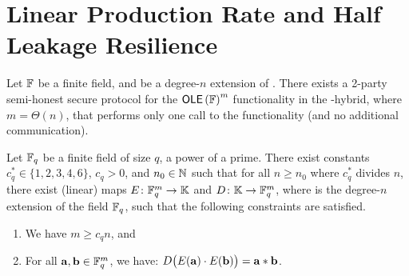 \section{Linear Production Rate and Half Leakage Resilience}

	\begin{theorem}
		\label{thm:embed-low}
		Let ${\mathbb F}$ be a finite field, and \bbK be a degree-$n$ extension of \bbF. 
		There exists a 2-party semi-honest secure protocol for the $\OLE[\bbF]^m$ functionality in the \OLE[\bbK]-hybrid, where $m=\Theta(n)$, that performs only one call to the \OLE[\bbK] functionality (and no additional communication). 
	\end{theorem}

	\begin{theorem}
		\label{thm:embed}
		Let ${\mathbb F}_q$ be a finite field of size $q$, a power of a prime. 
		There exist constants $c_q^* \in \{1,2,3,4,6\}$, $c_q > 0$, and $n_0 \in {\mathbb N}$ such that for all $n \geq n_0$ where $c_q^*$ divides $n$, there exist (linear) maps $E \colon {\mathbb F}^m_{q} \rightarrow {\mathbb K}$ and $D\colon {\mathbb K} \rightarrow {\mathbb F}^m_{q}$, where \bbK is the degree-$n$ extension of the field ${\mathbb F}_q$, such that the following constraints are satisfied.
		\begin{enumerate}
			\item We have $m \geq c_qn$, and
			\item For all ${\mathbf a}, {\mathbf b} \in {\mathbb F}_{q}^m$, we have: 
			$D\big( E({\mathbf a})\cdot E({\mathbf b}) \big) = {\mathbf a}*{\mathbf b}$. 
		\end{enumerate}
	\end{theorem}